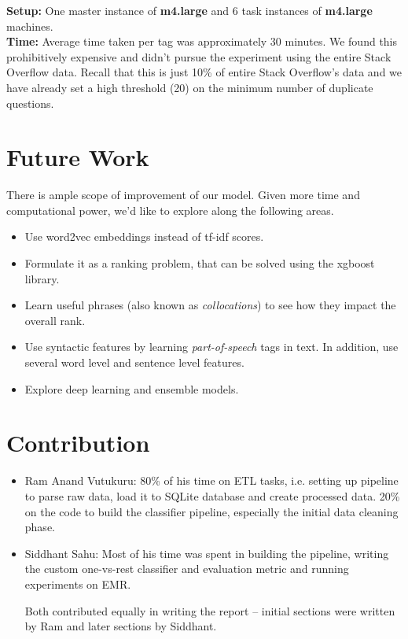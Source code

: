 \documentclass{article}
\begin{document}
\textbf{Setup:} One master instance of \textbf{m4.large} and 6 task instances of \textbf{m4.large} machines.\\

\textbf{Time:} Average time taken per tag was approximately 30 minutes. We found this prohibitively expensive and didn't pursue the experiment using the entire Stack Overflow data. Recall that this is just 10\% of entire Stack Overflow's data and we have already set a high threshold (20) on the minimum number of duplicate questions.

\section{Future Work}
There is ample scope of improvement of our model. Given more time and computational power, we'd like to explore along the following areas.

\begin{itemize}
	\item Use word2vec embeddings instead of tf-idf scores.
	\item Formulate it as a ranking problem, that can be solved using the xgboost library.
	\item Learn useful phrases (also known as \textit{collocations}) to see how they impact the overall rank.
	\item Use syntactic features by learning \textit{part-of-speech} tags in text. In addition, use several word level and sentence level features.
	\item Explore deep learning and ensemble models.
\end{itemize}


\section{Contribution}
\begin{itemize}
	\item Ram Anand Vutukuru: 80\% of his time on ETL tasks, i.e. setting up pipeline to parse raw data, load it to SQLite database and create processed data. 20\% on the code to build the classifier pipeline, especially the initial data cleaning phase.
	\item Siddhant Sahu: Most of his time was spent in building the pipeline, writing the custom one-vs-rest classifier and evaluation metric and running experiments on EMR.
	
	Both contributed equally in writing the report -- initial sections were written by Ram and later sections by Siddhant.
\end{itemize}
\end{document}
